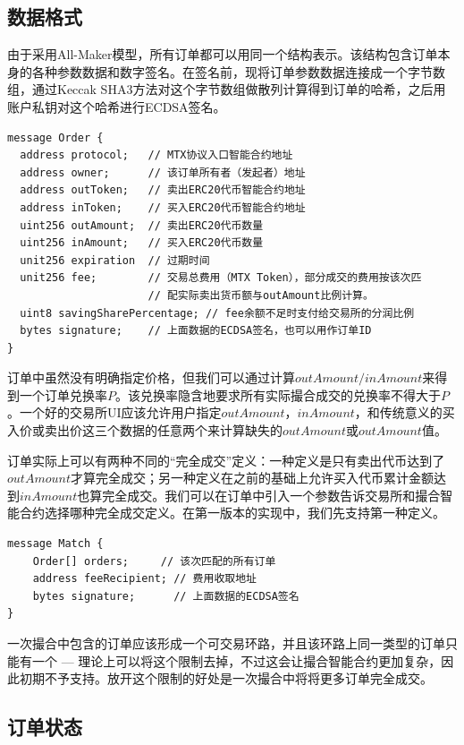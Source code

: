 \documentclass[UTF8,nofonts]{ctexart}
\begin{document}
\subsection{数据格式\label{sec:dataformat}}

由于采用All-Maker模型，所有订单都可以用同一个结构表示。该结构包含订单本身的各种参数数据和数字签名。在签名前，现将订单参数数据连接成一个字节数组，通过Keccak SHA3方法对这个字节数组做散列计算得到订单的哈希，之后用账户私钥对这个哈希进行ECDSA签名。


\begin{verbatim}
message Order {
  address protocol;   // MTX协议入口智能合约地址
  address owner;      // 该订单所有者（发起者）地址
  address outToken;   // 卖出ERC20代币智能合约地址
  address inToken;    // 买入ERC20代币智能合约地址
  uint256 outAmount;  // 卖出ERC20代币数量
  uint256 inAmount;   // 买入ERC20代币数量
  unit256 expiration  // 过期时间
  unit256 fee;        // 交易总费用（MTX Token），部分成交的费用按该次匹
                      // 配实际卖出货币额与outAmount比例计算。
  uint8 savingSharePercentage; // fee余额不足时支付给交易所的分润比例
  bytes signature;    // 上面数据的ECDSA签名，也可以用作订单ID
}	
\end{verbatim}

订单中虽然没有明确指定价格，但我们可以通过计算$outAmount/inAmount$来得到一个订单兑换率$P$。该兑换率隐含地要求所有实际撮合成交的兑换率不得大于$P$。一个好的交易所UI应该允许用户指定$outAmount$，$inAmount$，和传统意义的买入价或卖出价这三个数据的任意两个来计算缺失的$outAmount$或$outAmount$值。

订单实际上可以有两种不同的“完全成交”定义：一种定义是只有卖出代币达到了$outAmount$才算完全成交；另一种定义在之前的基础上允许买入代币累计金额达到$inAmount$也算完全成交。我们可以在订单中引入一个参数告诉交易所和撮合智能合约选择哪种完全成交定义。在第一版本的实现中，我们先支持第一种定义。

\begin{verbatim}
message Match {
    Order[] orders;     // 该次匹配的所有订单
    address feeRecipient; // 费用收取地址
    bytes signature;      // 上面数据的ECDSA签名
}
\end{verbatim}

一次撮合中包含的订单应该形成一个可交易环路，并且该环路上同一类型的订单只能有一个 --- 理论上可以将这个限制去掉，不过这会让撮合智能合约更加复杂，因此初期不予支持。放开这个限制的好处是一次撮合中将将更多订单完全成交。



\subsection{订单状态\label{sec:orderstate}}
\end{document}

